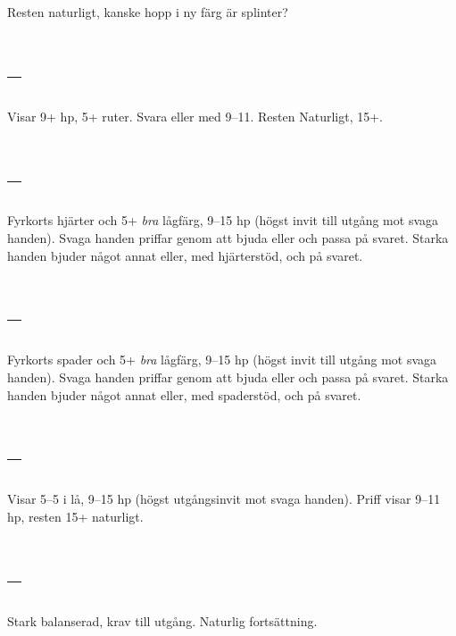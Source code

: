 Resten naturligt, kanske hopp i ny färg är splinter?

\section{ -- }

Visar 9+ hp, 5+ ruter. Svara  eller  med 9--11. Resten
Naturligt, 15+.

\section{ -- }

Fyrkorts hjärter och 5+ \emph{bra} lågfärg, 9--15 hp (högst invit till
utgång mot svaga handen). Svaga handen priffar genom att bjuda  eller
 och passa på svaret. Starka handen bjuder något annat eller, med
hjärterstöd,  och  på svaret. 

\section{ -- }

Fyrkorts spader och 5+ \emph{bra} lågfärg, 9--15 hp (högst invit till
utgång mot svaga handen). Svaga handen priffar genom att bjuda  eller
 och passa på svaret. Starka handen bjuder något annat eller, med
spaderstöd,  och  på svaret. 

\section{ -- }

Visar 5--5 i lå, 9--15 hp (högst utgångsinvit mot svaga handen). Priff
visar 9--11 hp, resten 15+ naturligt.

\section{ -- }

Stark balanserad, krav till utgång. Naturlig fortsättning.
 

